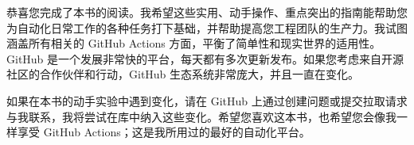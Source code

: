 
恭喜您完成了本书的阅读。我希望这些实用、动手操作、重点突出的指南能帮助您为自动化日常工作的各种任务打下基础，并帮助提高您工程团队的生产力。我试图涵盖所有相关的 GitHub Actions 方面，平衡了简单性和现实世界的适用性。GitHub 是一个发展非常快的平台，每天都有多次更新发布。如果您考虑来自开源社区的合作伙伴和行动，GitHub 生态系统非常庞大，并且一直在变化。

如果在本书的动手实验中遇到变化，请在 GitHub 上通过创建问题或提交拉取请求与我联系，我将尝试在库中纳入这些变化。希望您喜欢这本书，也希望您会像我一样享受 GitHub Actions；这是我所用过的最好的自动化平台。










